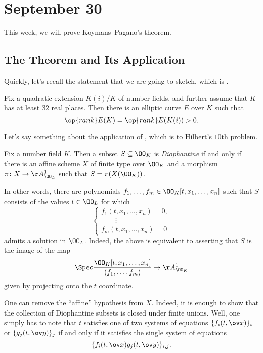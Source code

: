 \documentclass[../notes.tex]{subfiles}
\begin{document}
\section{September 30}
This week, we will prove Koymans--Pagano's theorem.

\subsection{The Theorem and Its Application}
Quickly, let's recall the statement that we are going to sketch, which is \cite[Theorem~2.4]{koymans-pagano-h10}.
\begin{theorem} \label{thm:kp}
	Fix a quadratic extension $K(i)/K$ of number fields, and further assume that $K$ has at least $32$ real places. Then there is an elliptic curve $E$ over $K$ such that
	\[\op{rank}E(K)=\op{rank}E(K(i))>0.\]
\end{theorem}
Let's say something about the application of , which is to Hilbert's $10$th problem.
\begin{definition}[Diophantine]
	Fix a number field $K$. Then a subset $S\subseteq\OO_K$ is \textit{Diophantine} if and only if there is an affine scheme $X$ of finite type over $\OO_K$ and a morphism $\pi\colon X\to\AA^1_{\OO_L}$ such that $S=\pi(X(\OO_K))$.
\end{definition}
\begin{remark}
	In other words, there are polynomials $f_1,\ldots,f_m\in\OO_K[t,x_1,\ldots,x_n]$ such that $S$ consists of the values $t\in\OO_L$ for which
	\[\begin{cases}
		f_1(t,x_1,\ldots,x_n)=0, \\
		\qquad\vdots \\
		f_m(t,x_1,\ldots,x_n)=0
	\end{cases}\]
	admits a solution in $\OO_L$. Indeed, the above is equivalent to asserting that $S$ is the image of the map
	\[\Spec\frac{\OO_K[t,x_1,\ldots,x_n]}{(f_1,\ldots,f_m)}\to\AA^1_{\OO_K}\]
	given by projecting onto the $t$ coordinate.
\end{remark}
\begin{remark}
	One can remove the ``affine'' hypothesis from $X$. Indeed, it is enough to show that the collection of Diophantine subsets is closed under finite unions. Well, one simply has to note that $t$ satisfies one of two systems of equations $\{f_i(t,\ov x)\}_i$ or $\{g_j(t,\ov y)\}_j$ if and only if it satisfies the single system of equations
	\[\{f_i(t,\ov x)g_j(t,\ov y)\}_{i,j}.\]
\end{remark}
\end{document}
